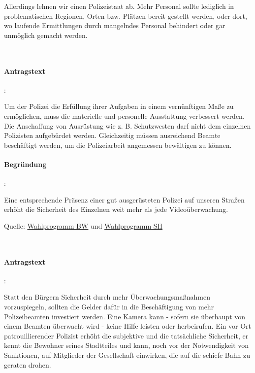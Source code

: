 Allerdings lehnen wir einen Polizeistaat ab. Mehr Personal sollte lediglich in problematischen Regionen, Orten bzw. Plätzen bereit gestellt werden, oder dort, wo laufende Ermittlungen durch mangelndes Personal behindert oder gar unmöglich gemacht werden.


\\

\paragraph{Antragstext}:

Um der Polizei die Erfüllung ihrer Aufgaben in einem vernünftigen Maße zu ermöglichen, muss die materielle und personelle Ausstattung verbessert werden. Die Anschaffung von Ausrüstung wie z. B. Schutzwesten darf nicht dem einzelnen Polizisten aufgebürdet werden. Gleichzeitig müssen ausreichend Beamte beschäftigt werden, um die Polizeiarbeit angemessen bewältigen zu können. 

\paragraph{Begründung}:

Eine entsprechende Präsenz einer gut ausgerüsteten Polizei auf unseren Straßen erhöht die Sicherheit des Einzelnen weit mehr als jede Videoüberwachung.

Quelle: \href{http://www.piratenpartei-bw.de/wahl/wahlprogramm/inneres-und-justiz/}{Wahlprogramm BW} und \href{http://wiki.piratenpartei.de/SH:Landtagswahl_2012/Wahlprogramm#Inneres_und_Justiz}{Wahlprogramm SH}


\\

\paragraph{Antragstext}:

Statt den Bürgern Sicherheit durch mehr Überwachungsmaßnahmen vorzuspiegeln, sollten die Gelder dafür in die Beschäftigung von mehr Polizeibeamten investiert werden. Eine Kamera kann - sofern sie überhaupt von einem Beamten überwacht wird - keine Hilfe leisten oder herbeirufen. Ein vor Ort patrouillierender Polizist erhöht die subjektive und die tatsächliche Sicherheit, er kennt die Bewohner {\Gu}seines{\Go} Stadtteiles und kann, noch vor der Notwendigkeit von Sanktionen, auf Mitglieder der Gesellschaft einwirken, die auf die schiefe Bahn zu geraten drohen.

